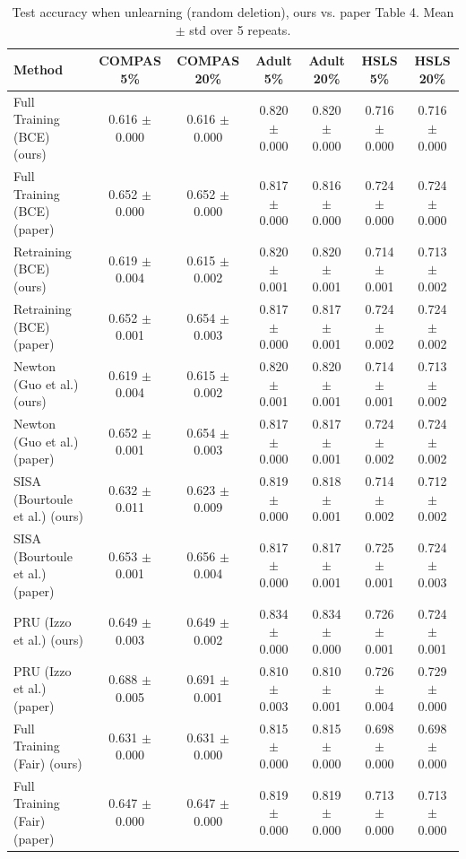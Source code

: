 \begin{table}[t]
\centering
\scriptsize
\caption{Test accuracy when unlearning (random deletion), ours vs. paper Table 4. Mean $\pm$ std over 5 repeats.}
\label{tab:accuracy_random}
\begin{tabular}{lcccccc}
\hline
Method & COMPAS 5\% & COMPAS 20\% & Adult 5\% & Adult 20\% & HSLS 5\% & HSLS 20\% \\
\hline
Full Training (BCE) (ours) & 0.616 $\pm$ 0.000 & 0.616 $\pm$ 0.000 & 0.820 $\pm$ 0.000 & 0.820 $\pm$ 0.000 & 0.716 $\pm$ 0.000 & 0.716 $\pm$ 0.000 \\
Full Training (BCE) (paper) & 0.652 $\pm$ 0.000 & 0.652 $\pm$ 0.000 & 0.817 $\pm$ 0.000 & 0.816 $\pm$ 0.000 & 0.724 $\pm$ 0.000 & 0.724 $\pm$ 0.000 \\
Retraining (BCE) (ours) & 0.619 $\pm$ 0.004 & 0.615 $\pm$ 0.002 & 0.820 $\pm$ 0.001 & 0.820 $\pm$ 0.001 & 0.714 $\pm$ 0.001 & 0.713 $\pm$ 0.002 \\
Retraining (BCE) (paper) & 0.652 $\pm$ 0.001 & 0.654 $\pm$ 0.003 & 0.817 $\pm$ 0.000 & 0.817 $\pm$ 0.001 & 0.724 $\pm$ 0.002 & 0.724 $\pm$ 0.002 \\
Newton (Guo et al.) (ours) & 0.619 $\pm$ 0.004 & 0.615 $\pm$ 0.002 & 0.820 $\pm$ 0.001 & 0.820 $\pm$ 0.001 & 0.714 $\pm$ 0.001 & 0.713 $\pm$ 0.002 \\
Newton (Guo et al.) (paper) & 0.652 $\pm$ 0.001 & 0.654 $\pm$ 0.003 & 0.817 $\pm$ 0.000 & 0.817 $\pm$ 0.001 & 0.724 $\pm$ 0.002 & 0.724 $\pm$ 0.002 \\
SISA (Bourtoule et al.) (ours) & 0.632 $\pm$ 0.011 & 0.623 $\pm$ 0.009 & 0.819 $\pm$ 0.000 & 0.818 $\pm$ 0.001 & 0.714 $\pm$ 0.002 & 0.712 $\pm$ 0.002 \\
SISA (Bourtoule et al.) (paper) & 0.653 $\pm$ 0.001 & 0.656 $\pm$ 0.004 & 0.817 $\pm$ 0.000 & 0.817 $\pm$ 0.001 & 0.725 $\pm$ 0.001 & 0.724 $\pm$ 0.003 \\
PRU (Izzo et al.) (ours) & 0.649 $\pm$ 0.003 & 0.649 $\pm$ 0.002 & 0.834 $\pm$ 0.000 & 0.834 $\pm$ 0.000 & 0.726 $\pm$ 0.001 & 0.724 $\pm$ 0.001 \\
PRU (Izzo et al.) (paper) & 0.688 $\pm$ 0.005 & 0.691 $\pm$ 0.001 & 0.810 $\pm$ 0.003 & 0.810 $\pm$ 0.001 & 0.726 $\pm$ 0.004 & 0.729 $\pm$ 0.000 \\
Full Training (Fair) (ours) & 0.631 $\pm$ 0.000 & 0.631 $\pm$ 0.000 & 0.815 $\pm$ 0.000 & 0.815 $\pm$ 0.000 & 0.698 $\pm$ 0.000 & 0.698 $\pm$ 0.000 \\
Full Training (Fair) (paper) & 0.647 $\pm$ 0.000 & 0.647 $\pm$ 0.000 & 0.819 $\pm$ 0.000 & 0.819 $\pm$ 0.000 & 0.713 $\pm$ 0.000 & 0.713 $\pm$ 0.000 \\

\end{tabular}
\end{table}
